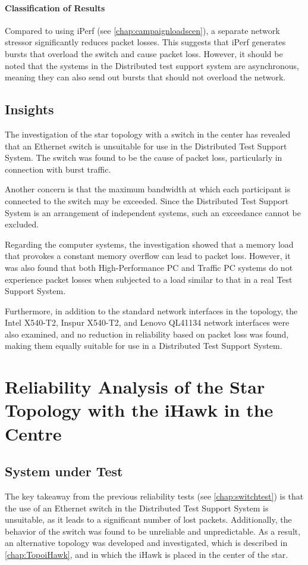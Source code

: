 \paragraph{Classification of Results}
Compared to using iPerf (see \ref{chap:campaignloadscen}), a separate network stressor significantly reduces packet losses. This suggests that iPerf generates bursts that overload the switch and cause packet loss. However, it should be noted that the systems in the Distributed test support system are asynchronous, meaning they can also send out bursts that should not overload the network.

\subsection{Insights}
The investigation of the star topology with a switch in the center has revealed that an Ethernet switch is unsuitable for use in the Distributed Test Support System. The switch was found to be the cause of packet loss, particularly in connection with burst traffic.

Another concern is that the maximum bandwidth at which each participant is connected to the switch may be exceeded. Since the Distributed Test Support System is an arrangement of independent systems, such an exceedance cannot be excluded.

Regarding the computer systems, the investigation showed that a memory load that provokes a constant memory overflow can lead to packet loss. However, it was also found that both High-Performance PC and Traffic PC systems do not experience packet losses when subjected to a load similar to that in a real Test Support System.

Furthermore, in addition to the standard network interfaces in the topology, the Intel X540-T2, Inspur X540-T2, and Lenovo QL41134 network interfaces were also examined, and no reduction in reliability based on packet loss was found, making them equally suitable for use in a Distributed Test Support System.




\section{Reliability Analysis of the Star Topology with the iHawk in the Centre} \label{chap:ReliabIhawk}

\subsection{System under Test} \label{chap:ReliabIhawk:SuT}
The key takeaway from the previous reliability tests (see \ref{chap:switchtest}) is that the use of an Ethernet switch in the Distributed Test Support System is unsuitable, as it leads to a significant number of lost packets. Additionally, the behavior of the switch was found to be unreliable and unpredictable. As a result, an alternative topology was developed and investigated, which is described in \ref{chap:TopoiHawk}, and in which the iHawk is placed in the center of the star.

